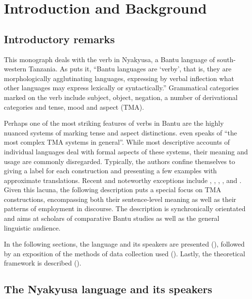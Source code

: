 \chapter{Introduction and Background}
\section{Introductory remarks}
This monograph deals with the verb in Nyakyusa, a Bantu language of south-western Tanzania. As \citet[21]{NurseD2008} puts it, ``Bantu languages are `verby', that is, they are morphologically agglutinating languages, expressing by verbal inflection what other languages may express lexically or syntactically.'' Grammatical categories marked on the verb include subject, object, negation, a number of derivational categories and tense, mood and aspect (TMA).

Perhaps one of the most striking features of verbs in Bantu are the highly nuanced systems of marking tense and aspect distinctions. \citet[185]{DahlOe1985} even speaks of ``the most complex TMA systems in general''. While most descriptive accounts of individual languages deal with formal aspects of these systems, their meaning and usage are commonly disregarded. Typically, the authors confine themselves to giving a label for each construction and presenting a few examples with approximate translations. Recent and noteworthy exceptions include \citet{FleischA2000}, \citet{KershnerT2002}, \citet{BotneROchwadaHMarloM2006}, \citet{BotneR2008}, and \citet{CraneTM2011}. Given this lacuna, the following description puts a special focus on TMA constructions, encompassing both their sentence-level meaning as well as their patterns of employment in discourse. The description is synchronically orientated and aims at scholars of comparative Bantu studies as well as the general linguistic audience.

In the following sections, the language and its speakers are presented (), followed by an exposition of the methods of data collection used (). Lastly, the theoretical framework is described ().
\section{The Nyakyusa language and its speakers}\label{LanguageAndSpeakers}
